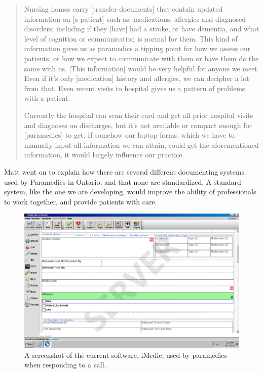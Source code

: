 \blockquote{Nursing homes carry [transfer documents] that contain updated information on [a patient] such as: medications, allergies and diagnosed disorders; including if they [have] had a stroke, or have dementia, and what level of cognition or communication is normal for them. This kind of information gives us as paramedics a tipping point for how we assess our patients, or how we expect to communicate with them or have them do the same with us. [This information] would be very helpful for anyone we meet. Even if it's only [medication] history and allergies, we can decipher a lot from that. Even recent visits to hospital gives us a pattern of problems with a patient.

Currently the hospital can scan their card and get all prior hospital visits and diagnoses on discharges, but it's not available or compact enough for [paramedics] to get. If somehow our laptop forms, which we have to manually input all information we can attain, could get the aforementioned information, it would largely influence our practice.
}

Matt went on to explain how there are several different documenting systems used by Paramedics in Ontario, and that none are standardized. A standard system, like the one we are developing, would improve the ability of professionals to work together, and provide patients with care.

\begin{figure}[h]
  \centering
  \includegraphics[width=\linewidth]{iMedic.png}
  \captionsetup{format=hang}
  \caption[Screenshot of iMedic Software]{A screenshot of the current software, iMedic, used by paramedics when responding to a call.}
  \label{fig:iMed1}
\end{figure}

